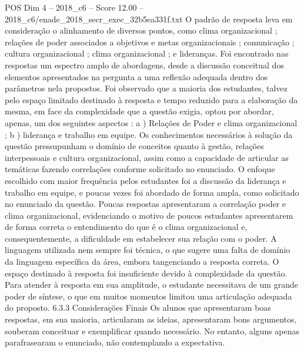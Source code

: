 \begin{textsample}{POS Dim 4 – 2018\_c6 – Score 12.00 – 2018\_c6/enade\_2018\_secr\_exec\_32b5ea331f.txt}
O padrão de resposta leva em consideração o alinhamento de diversos pontos, como clima organizacional ; relações de poder associados a objetivos e metas organizacionais ; comunicação ; cultura organizacional ; clima organizacional ; e lideranças.
Foi encontrado nas respostas um espectro amplo de abordagens, desde a discussão conceitual dos elementos apresentados na pergunta a uma reflexão adequada dentro dos parâmetros nela propostos.
Foi observado que a maioria dos estudantes, talvez pelo espaço limitado destinado à resposta e tempo reduzido para a elaboração da mesma, em face da complexidade que a questão exigia, optou por abordar, apenas, um dos seguintes aspectos : a ) Relações de Poder e clima organizacional ; b ) liderança e trabalho em equipe.
Os conhecimentos necessários à solução da questão pressupunham o domínio de conceitos quanto à gestão, relações interpessoais e cultura organizacional, assim como a capacidade de articular as temáticas fazendo correlações conforme solicitado no enunciado.
O enfoque escolhido com maior frequência pelos estudantes foi a discussão da liderança e trabalho em equipe, e poucas vezes foi abordado de forma ampla, como solicitado no enunciado da questão.
Poucas respostas apresentaram a correlação poder e clima organizacional, evidenciando o motivo de poucos estudantes apresentarem de forma correta o entendimento do que é o clima organizacional e, consequentemente, a dificuldade em estabelecer sua relação com o poder.
A linguagem utilizada nem sempre foi técnica, o que sugere uma falta de domínio da linguagem específica da área, embora tangenciando a resposta correta.
O espaço destinado à resposta foi insuficiente devido à complexidade da questão.
Para atender à resposta em sua amplitude, o estudante necessitava de um grande poder de síntese, o que em muitos momentos limitou uma articulação adequada do proposto. 6.3.3 Considerações Finais Os alunos que apresentaram boas respostas, em sua maioria, articularam as ideias, apresentaram bons argumentos, souberam conceituar e exemplificar quando necessário.
No entanto, alguns apenas parafrasearam o enunciado, não contemplando a expectativa.

\end{textsample}
